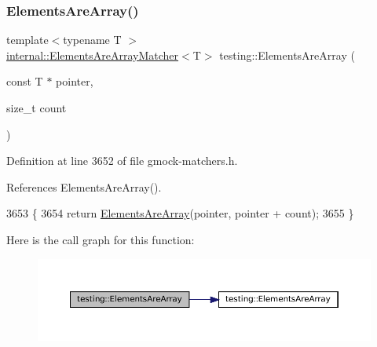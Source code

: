 \subsubsection{\texorpdfstring{Elements\+Are\+Array()}{ElementsAreArray()}\hspace{0.1cm}{\footnotesize\ttfamily [2/4]}}
{\footnotesize\ttfamily template$<$typename T $>$ \\
\hyperlink{classtesting_1_1internal_1_1ElementsAreArrayMatcher}{internal\+::\+Elements\+Are\+Array\+Matcher}$<$T$>$ testing\+::\+Elements\+Are\+Array (\begin{DoxyParamCaption}\item[{const T $\ast$}]{pointer,  }\item[{size\+\_\+t}]{count }\end{DoxyParamCaption})\hspace{0.3cm}{\ttfamily [inline]}}



Definition at line 3652 of file gmock-\/matchers.\+h.



References Elements\+Are\+Array().


\begin{DoxyCode}
3653                                     \{
3654   \textcolor{keywordflow}{return} \hyperlink{namespacetesting_ad257747adbe056feaa92f449063d681f}{ElementsAreArray}(pointer, pointer + count);
3655 \}
\end{DoxyCode}
Here is the call graph for this function\+:
\nopagebreak
\begin{figure}[H]
\begin{center}
\leavevmode
\includegraphics[width=350pt]{namespacetesting_abf5c2219b4e6a7542368b5f68eadd007_cgraph}
\end{center}
\end{figure}
\mbox{\label{namespacetesting_ac5895c9867d6b976351446a043dcdd66}} 
